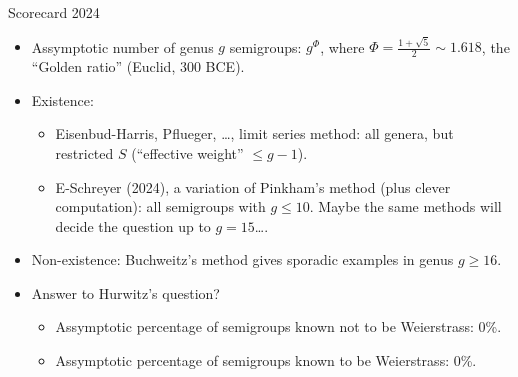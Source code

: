 \documentclass[12pt, aspectratio=169]{beamer}
\begin{document}
\begin{frame}{Scorecard 2024}\
\begin{itemize}
\item<1-> Assymptotic number of genus $g$ semigroups: $g^\Phi$, where $\Phi = \frac{1+\sqrt 5}{2}\sim 1.618$, the ``Golden ratio'' (Euclid, 300 BCE).
 \item<2-> Existence: 
\begin{itemize}
  \item<3-> Eisenbud-Harris, Pflueger, \dots, limit series method: all genera, but restricted $S$ (``effective weight'' $\leq g-1$).
\item<3-> E-Schreyer (2024), a variation of Pinkham's method (plus clever computation): all semigroups with $g\leq 10$. Maybe the same methods will decide the question up to $g =15$\dots .
\end{itemize}
\item<4-> Non-existence: Buchweitz's method gives sporadic examples in genus $g \geq 16$.
\item<5-> Answer to Hurwitz's question?
\begin{itemize}
  \item<6-> \alert{Assymptotic percentage of semigroups  known not to be Weierstrass: 0\%.}
 \item<6-> \alert{Assymptotic percentage of semigroups  known to be Weierstrass: 0\%.}
\end{itemize}
 \end{itemize}
\end{frame}
\end{document}
